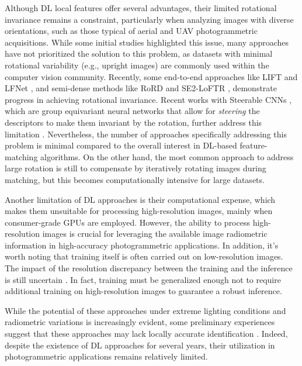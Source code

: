 Although DL local features offer several advantages, their limited rotational invariance remains a constraint, particularly when analyzing images with diverse orientations, such as those typical of aerial and UAV photogrammetric acquisitions. 
While some initial studies highlighted this issue, many approaches have not prioritized the solution to this problem, as datasets with minimal rotational variability (e.g., upright images) are commonly used within the computer vision community. 
Recently, some end-to-end approaches like LIFT \citep{yi2016lift} and LFNet \citep{ono2018lfnet}, and semi-dense methods like RoRD \citep{parihar2022rord} and SE2-LoFTR \citep{Bkman2022_se2loftr}, demonstrate progress in achieving rotational invariance. 
Recent works with Steerable CNNs \citep{cohen2016steerable}, which are group equivariant neural networks that allow for \textit{steering} the descriptors to make them invariant by the rotation, further address this limitation \cite{Bkman2022_se2loftr, bokman2023steerers}.
Nevertheless, the number of approaches specifically addressing this problem is minimal compared to the overall interest in DL-based feature-matching algorithms.
On the other hand, the most common approach to address large rotation is still to compensate by iteratively rotating images during matching, but this becomes computationally intensive for large datasets.

Another limitation of DL approaches is their computational expense, which makes them unsuitable for processing high-resolution images, mainly when consumer-grade GPUs are employed. 
However, the ability to process high-resolution images is crucial for leveraging the available image radiometric information in high-accuracy photogrammetric applications.
In addition, it's worth noting that training itself is often carried out on low-resolution images. 
The impact of the resolution discrepancy between the training and the inference is still uncertain \cite{Wu2024_evaluation_dlstereo}.
In fact, training must be generalized enough not to require additional training on high-resolution images to guarantee a robust inference.

While the potential of these approaches under extreme lighting conditions and radiometric variations is increasingly evident, some preliminary experiences suggest that these approaches may lack locally accurate identification \cite{Morelli2024_dim}. 
Indeed, despite the existence of DL approaches for several years, their utilization in photogrammetric applications remains relatively limited. 

